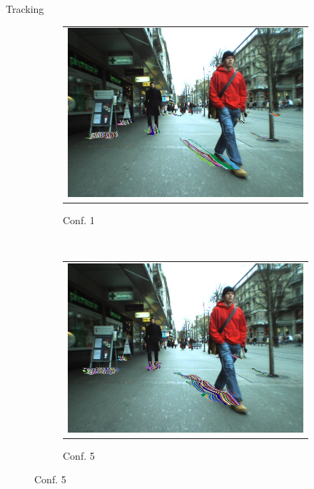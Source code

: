 \begin{frame}[plain]{Tracking}
\begin{center}
{\begin{figure}
\begin{subfigure}[b]{0.45\textwidth}
	  \begin{tabular}{c}
	    \includegraphics[width=\textwidth]{trackingConf1}
	  \end{tabular}
	  \caption*{Conf. 1}
        \end{subfigure}%
        ~
        \begin{subfigure}[b]{0.45\textwidth}
	  \begin{tabular}{c}
	    \includegraphics[width=\textwidth]{trackingConf5}
	  \end{tabular}
	  \caption*{Conf. 5}
        \end{subfigure}%
        

\end{figure}}
\end{center}
\end{frame}
